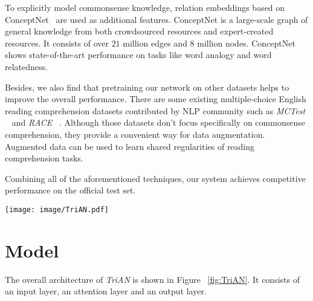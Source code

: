 \documentclass[11pt,a4paper]{article}
\begin{document}
To explicitly model commonsense knowledge,
relation embeddings based on ConceptNet~\cite{speer2017conceptnet} are used as additional features.
ConceptNet is a large-scale graph of general knowledge
from both crowdsourced resources and expert-created resources.
It consists of over $21$ million edges and $8$ million nodes.
ConceptNet shows state-of-the-art performance on tasks like word analogy and word relatedness.

Besides,
we also find that pretraining our network on other datasets helps to improve the overall performance.
There are some existing multiple-choice English reading comprehension datasets
contributed by NLP community such as \emph{MCTest} ~\cite{richardson2013mctest} and \emph{RACE} ~\cite{lai2017race}.
Although those datasets don't focus specifically on commonsense comprehension,
they provide a convenient way for data augmentation.
Augmented data can be used to learn shared regularities of reading comprehension tasks.

Combining all of the aforementioned techniques,
our system achieves competitive performance on the official test set.

\begin{figure*}[ht]
\begin{center}
 \texttt{[image: image/TriAN.pdf]}
 \caption{\emph{TriAN} Model Architecture.}
 \label{fig:TriAN}
\end{center}
\end{figure*}

\section{Model}
The overall architecture of \emph{TriAN} is shown in Figure ~\ref{fig:TriAN}.
It consists of an input layer,
an attention layer and an output layer.
\end{document}
